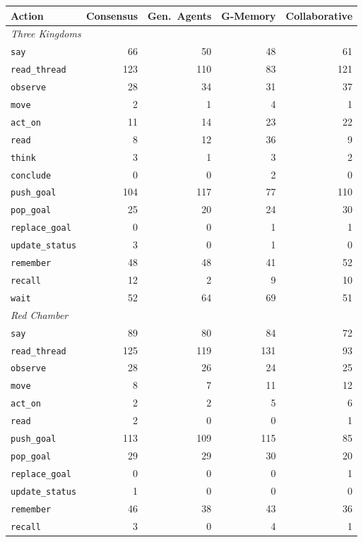 \begin{tabular}{lrrrr}
\toprule
Action & Consensus & Gen.\ Agents & G-Memory & Collaborative \\
\midrule
\multicolumn{5}{l}{\emph{Three Kingdoms}} \\
\quad\texttt{say} & 66 & 50 & 48 & 61 \\
\quad\texttt{read\_thread} & 123 & 110 & 83 & 121 \\
\quad\texttt{observe} & 28 & 34 & 31 & 37 \\
\quad\texttt{move} & 2 & 1 & 4 & 1 \\
\quad\texttt{act\_on} & 11 & 14 & 23 & 22 \\
\quad\texttt{read} & 8 & 12 & 36 & 9 \\
\quad\texttt{think} & 3 & 1 & 3 & 2 \\
\quad\texttt{conclude} & 0 & 0 & 2 & 0 \\
\quad\texttt{push\_goal} & 104 & 117 & 77 & 110 \\
\quad\texttt{pop\_goal} & 25 & 20 & 24 & 30 \\
\quad\texttt{replace\_goal} & 0 & 0 & 1 & 1 \\
\quad\texttt{update\_status} & 3 & 0 & 1 & 0 \\
\quad\texttt{remember} & 48 & 48 & 41 & 52 \\
\quad\texttt{recall} & 12 & 2 & 9 & 10 \\
\quad\texttt{wait} & 52 & 64 & 69 & 51 \\
\midrule
\multicolumn{5}{l}{\emph{Red Chamber}} \\
\quad\texttt{say} & 89 & 80 & 84 & 72 \\
\quad\texttt{read\_thread} & 125 & 119 & 131 & 93 \\
\quad\texttt{observe} & 28 & 26 & 24 & 25 \\
\quad\texttt{move} & 8 & 7 & 11 & 12 \\
\quad\texttt{act\_on} & 2 & 2 & 5 & 6 \\
\quad\texttt{read} & 2 & 0 & 0 & 1 \\
\quad\texttt{push\_goal} & 113 & 109 & 115 & 85 \\
\quad\texttt{pop\_goal} & 29 & 29 & 30 & 20 \\
\quad\texttt{replace\_goal} & 0 & 0 & 0 & 1 \\
\quad\texttt{update\_status} & 1 & 0 & 0 & 0 \\
\quad\texttt{remember} & 46 & 38 & 43 & 36 \\
\quad\texttt{recall} & 3 & 0 & 4 & 1 \\

\end{tabular}
